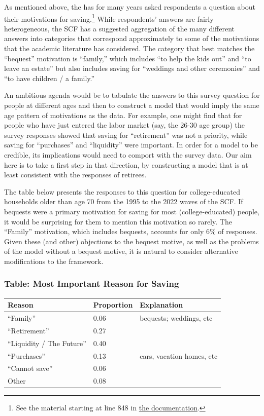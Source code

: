 \documentclass{article}
\begin{document}
As mentioned above, the \cite{2023} has for many years asked respondents a question about their motivations for saving.\footnote{See the material starting at line 848 in \href{https://www.federalreserve.gov/econres/files/bulletin.macro.txt}{the documentation}.}
While respondents' answers are fairly heterogeneous, the SCF has a suggested aggregation of the many different answers into categories that correspond approximately to some of the motivations that the academic literature has considered.
The category that best matches the ``bequest'' motivation is ``family,'' which includes ``to help the kids out'' and ``to leave an estate'' but also includes saving for ``weddings and other ceremonies'' and ``to have children / a family.''

An ambitious agenda would be to tabulate the answers to this survey question for people at different ages and then to construct a model that would imply the same age pattern of motivations as the data.
For example, one might find that for people who have just entered the labor market (say, the 26-30 age group) the survey responses showed that saving for ``retirement'' was not a priority, while saving for ``purchases'' and ``liquidity'' were important.
In order for a model to be credible, its implications would need to comport with the survey data.
Our aim here is to take a first step in that direction, by constructing a model that is at least consistent with the responses of retirees.

The table below presents the responses to this question for college-educated households older than age 70 from the 1995 to the 2022 waves of the SCF.
If bequests were a primary motivation for saving for most (college-educated) people, it would be surprising for them to mention this motivation so rarely. The ``Family'' motivation, which includes bequests, accounts for only 6\% of responses.
Given these (and other) objections to the bequest motive, as well as the problems of the model without a bequest motive, it is natural to consider alternative modifications to the framework.

\subsubsection{Table: Most Important Reason for Saving}\label{most-important-reason}

\bigskip\noindent
\begin{tabular}{p{}p{}p{}}
\toprule
Reason & Proportion & Explanation \\
\hline
``Family'' & 0.06 & bequests; weddings, etc \\
``Retirement'' & 0.27 &  \\
``Liquidity / The Future'' & 0.40 &  \\
``Purchases'' & 0.13 & cars, vacation homes, etc \\
``Cannot save'' & 0.06 &  \\
Other & 0.08 &  \\
\bottomrule
\end{tabular}
\end{document}
